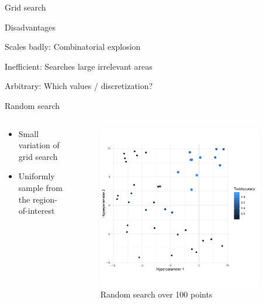\begin{frame}{Grid search}
\begin{blocki}{Disadvantages}
\item Scales badly: Combinatorial explosion
\item Inefficient: Searches large irrelevant areas
\item Arbitrary: Which values / discretization?
\end{blocki}
\end{frame}


\begin{frame}{Random search}



\begin{columns}
\begin{column}{0.49\textwidth}
\begin{itemize}
\item Small variation of grid search
\item Uniformly sample from the region-of-interest
\end{itemize}
\end{column}
\begin{column}{0.49\textwidth}
\vspace*{-0.8cm}
\begin{center}
\begin{figure}
\includegraphics[width=0.9\textwidth]{images/random.png}
\caption*{Random search over 100 points}
\end{figure}
\end{center}
\end{column}
\end{columns}


\end{frame}
